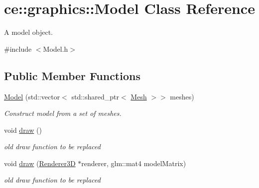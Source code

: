 \hypertarget{classce_1_1graphics_1_1_model}{}\section{ce\+:\+:graphics\+:\+:Model Class Reference}
\label{classce_1_1graphics_1_1_model}


A model object.  




{\ttfamily \#include $<$Model.\+h$>$}

\subsection*{Public Member Functions}
\begin{DoxyCompactItemize}
\item 
\mbox{\label{classce_1_1graphics_1_1_model_ae80b6da77f07543d9d423ca4884c63d1}} 
\hyperlink{classce_1_1graphics_1_1_model_ae80b6da77f07543d9d423ca4884c63d1}{Model} (std\+::vector$<$ std\+::shared\+\_\+ptr$<$ \hyperlink{classce_1_1graphics_1_1_mesh}{Mesh} $>$$>$ meshes)
\begin{DoxyCompactList}\small\item\em Construct model from a set of meshes. \end{DoxyCompactList}\item 
\mbox{\label{classce_1_1graphics_1_1_model_a32e4b5c3880eec770dabd21f8b053d49}} 
void \hyperlink{classce_1_1graphics_1_1_model_a32e4b5c3880eec770dabd21f8b053d49}{draw} ()
\begin{DoxyCompactList}\small\item\em old draw function to be replaced \end{DoxyCompactList}\item 
\mbox{\label{classce_1_1graphics_1_1_model_af8fcd0873c957a521146b6900eca2eaa}} 
void \hyperlink{classce_1_1graphics_1_1_model_af8fcd0873c957a521146b6900eca2eaa}{draw} (\hyperlink{classce_1_1graphics_1_1_renderer3_d}{Renderer3D} $\ast$renderer, glm\+::mat4 model\+Matrix)
\begin{DoxyCompactList}\small\item\em old draw function to be replaced \end{DoxyCompactList}\end{DoxyCompactItemize}
